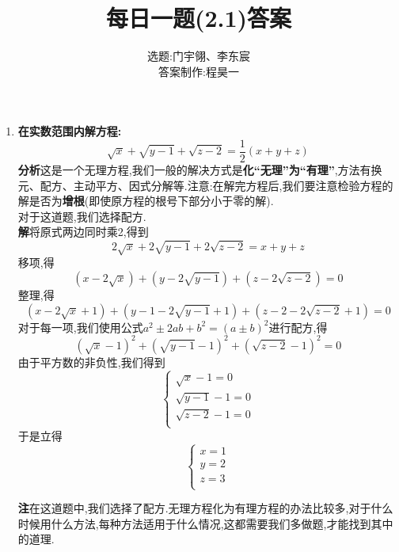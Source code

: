 \documentclass[UTF8]{ctexart}
\title{每日一题(2.1)答案}
\author{选题:门宇翎、李东宸\\答案制作:程昊一}
\begin{document}
\maketitle
\begin{enumerate}
\item \textbf{在实数范围内解方程:
\[\sqrt{x}+\sqrt{y-1}+\sqrt{z-2}=\frac{1}{2}(x+y+z)\]}
\hspace*{2em}\textbf{分析}\quad 这是一个无理方程,我们一般的解决方式是\textbf{化“无理”为“有理”},方法有换元、配方、主动平方、因式分解等.注意:在解完方程后,我们要注意检验方程的解是否为\textbf{增根}(即使原方程的根号下部分小于零的解).\\
\hspace*{2em}对于这道题,我们选择配方.\\
\hspace*{2em}\textbf{解}\quad 将原式两边同时乘2,得到
\[2\sqrt{x}+2\sqrt{y-1}+2\sqrt{z-2}=x+y+z\]
移项,得
\[(x-2\sqrt{x})+(y-2\sqrt{y-1})+(z-2\sqrt{z-2})=0\]
整理,得
\[(x-2\sqrt{x}+1)+(y-1-2\sqrt{y-1}+1)+(z-2-2\sqrt{z-2}+1)=0\]
\hspace*{2em}对于每一项,我们使用公式$a^2\pm 2ab+b^2=(a\pm b)^2$进行配方,得
\[(\sqrt{x}-1)^2+(\sqrt{y-1}-1)^2+(\sqrt{z-2}-1)^2=0\]
\hspace*{2em}由于平方数的非负性,我们得到
\[\begin{cases}
\sqrt{x}-1=0\\\sqrt{y-1}-1=0\\\sqrt{z-2}-1=0\\
\end{cases}\]
于是立得
\[\begin{cases}
x=1\\y=2\\z=3\\
\end{cases}\]

\hspace*{2em}\textbf{注}\quad 在这道题中,我们选择了配方.无理方程化为有理方程的办法比较多,对于什么时候用什么方法,每种方法适用于什么情况,这都需要我们多做题,才能找到其中的道理.\\


\end{enumerate}
\end{document}
